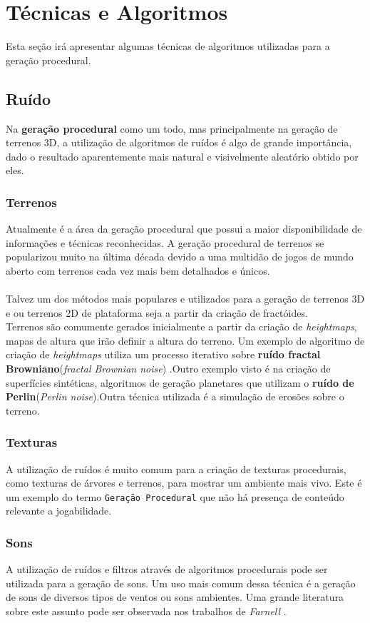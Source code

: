 
\section{Técnicas e Algoritmos}
	Esta seção irá apresentar algumas técnicas de algoritmos utilizadas para a geração procedural. 
	\subsection{Ruído}
		Na \textbf{geração procedural} como um todo, mas principalmente na geração de terrenos 3D, a utilização de algoritmos de ruídos 
		é algo de grande importância, dado o resultado aparentemente mais natural e visivelmente aleatório obtido por eles. \cite{Decipher}
	\subsubsection*{Terrenos}
		Atualmente é a área da geração procedural que possui a maior disponibilidade de informações e técnicas reconhecidas. A geração procedural de terrenos se popularizou muito na última década devido a uma multidão de jogos de mundo aberto 
		com terrenos cada vez mais bem detalhados e únicos.
		\\ \\Talvez um dos métodos mais populares e utilizados para a geração de terrenos 3D e ou terrenos 2D de plataforma seja a 
		partir da criação de fractóides. 
		\\Terrenos são comumente gerados inicialmente a partir da criação de \emph{heightmaps}, mapas de altura que irão definir a 	
		altura do terreno. Um exemplo de algoritmo de criação de \textit{heightmaps} utiliza um processo iterativo sobre \textbf{ruído fractal 		
		Browniano}(\textit{fractal Brownian noise}) \cite{ArTerrainGen}.Outro exemplo visto é na criação de superfícies sintéticas, algoritmos de geração planetares que utilizam o \textbf{ruído de Perlin}(\textit{Perlin noise}).Outra técnica utilizada é a simulação de erosões sobre o terreno.
	\subsubsection*{Texturas}
		A utilização de ruídos é muito comum para a criação de texturas procedurais, como texturas de árvores e terrenos, para mostrar um 
		ambiente mais vivo. Este é um exemplo do termo \texttt{Geração Procedural} que não há presença de conteúdo relevante a
		jogabilidade.
	\subsubsection*{Sons}
		A utilização de ruídos e filtros através de algoritmos procedurais pode ser utilizada para a geração de sons. 
		Um uso mais comum dessa técnica é a geração de sons de diversos tipos de ventos ou sons ambientes.
		Uma grande literatura sobre este assunto pode ser observada nos trabalhos de \textit{	
		Farnell} \cite{DesAud} \cite{DesAudVid}.

